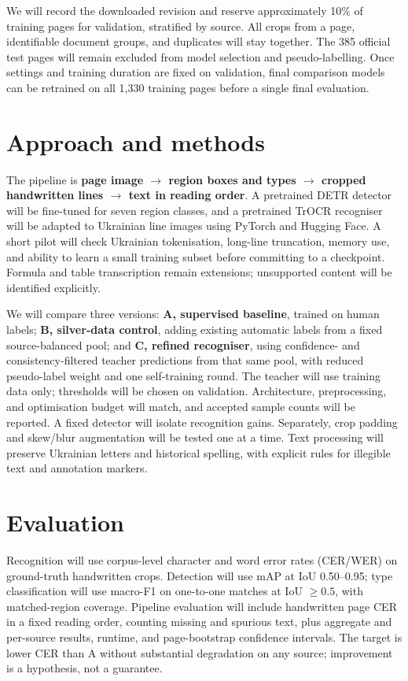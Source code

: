\documentclass[english]{ucuproposal}
\begin{document}
We will record the downloaded revision and reserve approximately 10\% of training pages for validation, stratified by source. All crops from a page, identifiable document groups, and duplicates will stay together. The 385 official test pages will remain excluded from model selection and pseudo-labelling. Once settings and training duration are fixed on validation, final comparison models can be retrained on all 1,330 training pages before a single final evaluation.

\section{Approach and methods}
The pipeline is \textbf{page image $\rightarrow$ region boxes and types $\rightarrow$ cropped handwritten lines $\rightarrow$ text in reading order}. A pretrained DETR detector will be fine-tuned for seven region classes, and a pretrained TrOCR recogniser will be adapted to Ukrainian line images using PyTorch and Hugging Face. A short pilot will check Ukrainian tokenisation, long-line truncation, memory use, and ability to learn a small training subset before committing to a checkpoint. Formula and table transcription remain extensions; unsupported content will be identified explicitly.

We will compare three versions: \textbf{A, supervised baseline}, trained on human labels; \textbf{B, silver-data control}, adding existing automatic labels from a fixed source-balanced pool; and \textbf{C, refined recogniser}, using confidence- and consistency-filtered teacher predictions from that same pool, with reduced pseudo-label weight and one self-training round. The teacher will use training data only; thresholds will be chosen on validation. Architecture, preprocessing, and optimisation budget will match, and accepted sample counts will be reported. A fixed detector will isolate recognition gains. Separately, crop padding and skew/blur augmentation will be tested one at a time. Text processing will preserve Ukrainian letters and historical spelling, with explicit rules for illegible text and annotation markers.

\section{Evaluation}
Recognition will use corpus-level character and word error rates (CER/WER) on ground-truth handwritten crops. Detection will use mAP at IoU 0.50--0.95; type classification will use macro-F1 on one-to-one matches at IoU $\geq0.5$, with matched-region coverage. Pipeline evaluation will include handwritten page CER in a fixed reading order, counting missing and spurious text, plus aggregate and per-source results, runtime, and page-bootstrap confidence intervals. The target is lower CER than A without substantial degradation on any source; improvement is a hypothesis, not a guarantee.
\end{document}
